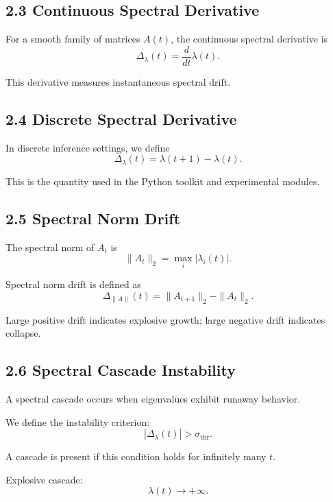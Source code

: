 \subsection*{2.3 Continuous Spectral Derivative}

For a smooth family of matrices $A(t)$, the continuous spectral
derivative is
\[
\Delta_\lambda(t)
= \frac{d}{dt} \lambda(t).
\]

This derivative measures instantaneous spectral drift.

\subsection*{2.4 Discrete Spectral Derivative}

In discrete inference settings, we define
\[
\Delta_\lambda(t)
= \lambda(t+1) - \lambda(t).
\]

This is the quantity used in the Python toolkit and experimental
modules.

\subsection*{2.5 Spectral Norm Drift}

The spectral norm of $A_t$ is
\[
\|A_t\|_2 = \max_i |\lambda_i(t)|.
\]

Spectral norm drift is defined as
\[
\Delta_{\|A\|}(t)
= \|A_{t+1}\|_2 - \|A_t\|_2.
\]

Large positive drift indicates explosive growth; large negative drift
indicates collapse.

\subsection*{2.6 Spectral Cascade Instability}

A spectral cascade occurs when eigenvalues exhibit runaway behavior.

We define the instability criterion:
\[
|\Delta_\lambda(t)| > \sigma_{\mathrm{thr}}.
\]

A cascade is present if this condition holds for infinitely many $t$.

Explosive cascade:
\[
\lambda(t) \to +\infty.
\]

